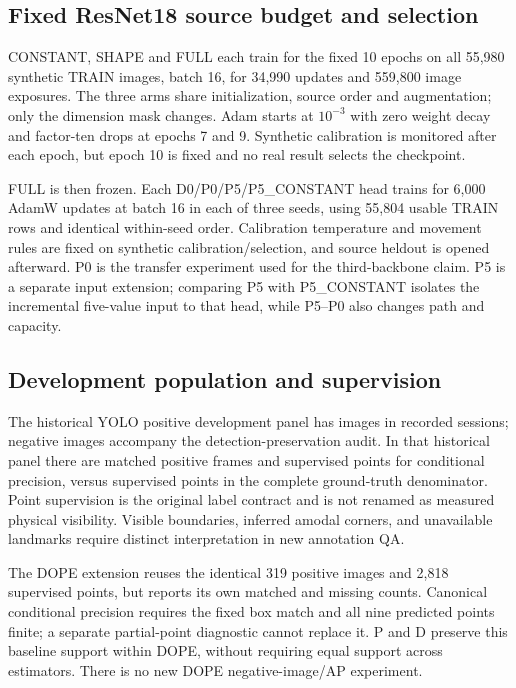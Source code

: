 \documentclass[journal]{IEEEtran}
\begin{document}
\subsection{Fixed ResNet18 source budget and selection}
CONSTANT, SHAPE and FULL each train for the fixed 10 epochs on all 55,980 synthetic TRAIN images, batch 16, for 34,990 updates and 559,800 image exposures. The three arms share initialization, source order and augmentation; only the dimension mask changes. Adam starts at $10^{-3}$ with zero weight decay and factor-ten drops at epochs 7 and 9. Synthetic calibration is monitored after each epoch, but epoch 10 is fixed and no real result selects the checkpoint.

FULL is then frozen. Each D0/P0/P5/P5\_CONSTANT head trains for 6,000 AdamW updates at batch 16 in each of three seeds, using 55,804 usable TRAIN rows and identical within-seed order. Calibration temperature and movement rules are fixed on synthetic calibration/selection, and source heldout is opened afterward. P0 is the transfer experiment used for the third-backbone claim. P5 is a separate input extension; comparing P5 with P5\_CONSTANT isolates the incremental five-value input to that head, while P5--P0 also changes path and capacity.

\subsection{Development population and supervision}
The historical YOLO positive development panel has \DevN{} images in \SessionN{} recorded sessions; \NegN{} negative images accompany the detection-preservation audit. In that historical panel there are \MatchedN{} matched positive frames and \MatchedPoints{} supervised points for conditional precision, versus \AllPoints{} supervised points in the complete ground-truth denominator. Point supervision is the original label contract and is not renamed as measured physical visibility. Visible boundaries, inferred amodal corners, and unavailable landmarks require distinct interpretation in new annotation QA.

The DOPE extension reuses the identical 319 positive images and 2,818 supervised points, but reports its own matched and missing counts. Canonical conditional precision requires the fixed box match and all nine predicted points finite; a separate partial-point diagnostic cannot replace it. P and D preserve this baseline support within DOPE, without requiring equal support across estimators. There is no new DOPE negative-image/AP experiment.
\end{document}
